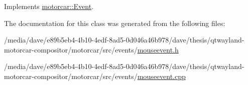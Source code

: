 Implements \hyperlink{classmotorcar_1_1Event_a195195c53c024bc76aa0e550ffe438a6}{motorcar\-::\-Event}.



The documentation for this class was generated from the following files\-:\begin{DoxyCompactItemize}
\item 
/media/dave/e89b5eb4-\/4b10-\/4edf-\/8ad5-\/0d046a46b978/dave/thesis/qtwayland-\/motorcar-\/compositor/motorcar/src/events/\hyperlink{mouseevent_8h}{mouseevent.\-h}\item 
/media/dave/e89b5eb4-\/4b10-\/4edf-\/8ad5-\/0d046a46b978/dave/thesis/qtwayland-\/motorcar-\/compositor/motorcar/src/events/\hyperlink{mouseevent_8cpp}{mouseevent.\-cpp}\end{DoxyCompactItemize}
